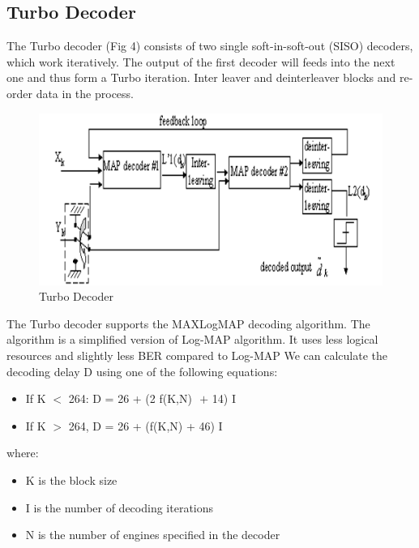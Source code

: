 \documentclass[conference,a4paper]{IEEEtran}
\begin{document}
\subsection{Turbo Decoder}
The Turbo decoder (Fig 4) consists of two single soft-in-soft-out (SISO) decoders, which work iteratively. The output of the first decoder will feeds into the next one and thus form a Turbo iteration. Inter leaver and deinterleaver blocks and re-order data in the process.
\begin{figure}[h!]
\centering
     \includegraphics[scale=0.78]{decoder.PNG}
    \caption{Turbo Decoder}
    \label{}
\end{figure}
The Turbo decoder supports the MAXLogMAP decoding algorithm. The algorithm is a simplified version of Log-MAP algorithm. It uses less logical resources and slightly less BER compared to Log-MAP
We can calculate the decoding delay D using one of the following equations:
\begin{itemize}
    \item If K $<$ 264: D = 26 + (2 \times f(K,N) $ $ $+$ $ $14)  \times I
\end{itemize}
\begin{itemize}
    \item If K $>$ 264, D = 26 + (f(K,N) + 46)  \times I
\end{itemize}

        
    


where:
\begin{itemize}
    \item K  is the block size
    \item I is the number of decoding iterations
    \item N is the number of engines specified in the decoder
\end{itemize}
\end{document}
